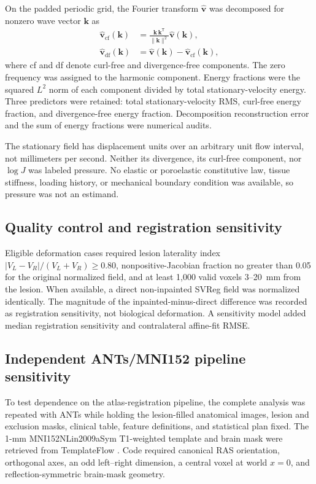 \documentclass[11pt]{article}
\begin{document}
On the padded periodic grid, the Fourier transform $\widehat{\mathbf{v}}$ was
decomposed for nonzero wave vector $\mathbf{k}$ as
\begin{align}
 \widehat{\mathbf{v}}_{\mathrm{cf}}(\mathbf{k}) & =
 \frac{\mathbf{k}\,\mathbf{k}^{\mathsf T}}
 {\lVert\mathbf{k}\rVert^2}\widehat{\mathbf{v}}(\mathbf{k}),\\
 \widehat{\mathbf{v}}_{\mathrm{df}}(\mathbf{k}) & =
 \widehat{\mathbf{v}}(\mathbf{k})-
 \widehat{\mathbf{v}}_{\mathrm{cf}}(\mathbf{k}),
\end{align}
where cf and df denote curl-free and divergence-free components. The zero
frequency was assigned to the harmonic component. Energy fractions were the
squared $L^2$ norm of each component divided by total stationary-velocity
energy. Three predictors were retained: total stationary-velocity RMS,
curl-free energy fraction, and divergence-free energy fraction. Decomposition
reconstruction error and the sum of energy fractions were numerical audits.

The stationary field has displacement units over an arbitrary unit flow
interval, not millimeters per second. Neither its divergence, its curl-free
component, nor $\log J$ was labeled pressure. No elastic or poroelastic
constitutive law, tissue stiffness, loading history, or mechanical boundary
condition was available, so pressure was not an estimand.

\subsection{Quality control and registration sensitivity}

Eligible deformation cases required lesion laterality index
$|V_L-V_R|/(V_L+V_R)\geq0.80$, nonpositive-Jacobian fraction no greater than
0.05 for the original normalized field, and at least 1,000 valid voxels 3--20~mm
from the lesion. When available, a direct non-inpainted SVReg field was
normalized identically. The magnitude of the inpainted-minus-direct difference
was recorded as registration sensitivity, not biological deformation. A
sensitivity model added median registration sensitivity and contralateral
affine-fit RMSE.

\subsection{Independent ANTs/MNI152 pipeline sensitivity}

To test dependence on the atlas-registration pipeline, the complete analysis
was repeated with ANTs while holding the lesion-filled anatomical images,
lesion and exclusion masks, clinical table,
feature definitions, and statistical plan fixed. The 1-mm
MNI152NLin2009aSym T1-weighted template and brain mask were retrieved from
TemplateFlow \citep{Fonov2009,Ciric2022}. Code required canonical RAS
orientation, orthogonal axes, an odd left--right dimension, a central voxel at
world $x=0$, and reflection-symmetric brain-mask geometry.
\end{document}
